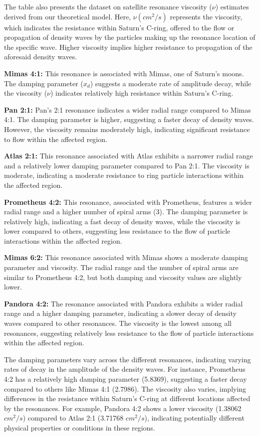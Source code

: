 \documentclass{article}
\begin{document}
The table also presents the dataset on satellite resonance viscosity ($\nu$) estimates derived from our theoretical model. Here, $\nu (cm^{2}/s)$ represents the viscosity, which indicates the resistance within Saturn's C-ring, offered to the flow or propagation of density waves by the particles making up the resonance location of the specific wave. Higher viscosity implies higher resistance to propagation of the aforesaid density waves.

\textbf{Mimas 4:1:}
This resonance is associated with Mimas, one of Saturn's moons. The damping parameter ($x_d$) suggests a moderate rate of amplitude decay, while the viscosity ($\nu$) indicates relatively high resistance within Saturn's C-ring.

\textbf{Pan 2:1:}
Pan's 2:1 resonance indicates a wider radial range compared to Mimas 4:1. The damping parameter is higher, suggesting a faster decay of density waves. However, the viscosity remains moderately high, indicating significant resistance to flow within the affected region.

\textbf{Atlas 2:1:}
This resonance associated with Atlas exhibits a narrower radial range and a relatively lower damping parameter compared to Pan 2:1. The viscosity is moderate, indicating a moderate resistance to ring particle interactions within the affected region.

\textbf{Prometheus 4:2:}
This resonance, associated with Prometheus, features a wider radial range and a higher number of spiral arms (3). The damping parameter is relatively high, indicating a fast decay of density waves, while the viscosity is lower compared to others, suggesting less resistance to the flow of particle interactions within the affected region.

\textbf{Mimas 6:2:}
This resonance associated with Mimas shows a moderate damping parameter and viscosity. The radial range and the number of spiral arms are similar to Prometheus 4:2, but both damping and viscosity values are slightly lower.

\textbf{Pandora 4:2:}
The resonance associated with Pandora exhibits a wider radial range and a higher damping parameter, indicating a slower decay of density waves compared to other resonances. The viscosity is the lowest among all resonances, suggesting relatively less resistance to the flow of particle interactions within the affected region.

The damping parameters vary across the different resonances, indicating varying rates of decay in the amplitude of the density waves. For instance, Prometheus 4:2 has a relatively high damping parameter (5.8369), suggesting a faster decay compared to others like Mimas 4:1 (2.7986). The viscosity also varies, implying differences in the resistance within Saturn's C-ring at different locations affected by the resonances. For example, Pandora 4:2 shows a lower viscosity (1.38062 $cm^{2}/s$) compared to Atlas 2:1 (3.71768 $cm^{2}/s$), indicating potentially different physical properties or conditions in these regions.
\end{document}
